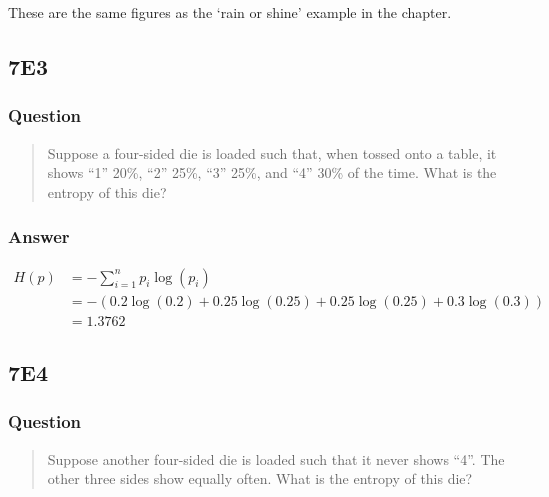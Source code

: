 \documentclass[
]{book}
\begin{document}
These are the same figures as the `rain or shine' example in the chapter.

\hypertarget{e3-5}{%
\subsection*{7E3}\label{e3-5}}

\hypertarget{question-62}{%
\subsubsection*{Question}\label{question-62}}

\begin{quote}
Suppose a four-sided die is loaded such that, when tossed onto a table, it shows ``1'' 20\%, ``2'' 25\%, ``3'' 25\%, and ``4'' 30\% of the time. What is the entropy of this die?
\end{quote}

\hypertarget{answer-62}{%
\subsubsection*{Answer}\label{answer-62}}

\[\begin{aligned}
H(p) &= -\sum^n_{i=1}p_i \log(p_i) \\
&= -(0.2 \log(0.2) + 0.25 \log(0.25) + 0.25 \log(0.25) + 0.3 \log(0.3))\\
&= 1.3762
\end{aligned}\]

\hypertarget{e4-5}{%
\subsection*{7E4}\label{e4-5}}

\hypertarget{question-63}{%
\subsubsection*{Question}\label{question-63}}

\begin{quote}
Suppose another four-sided die is loaded such that it never shows ``4''. The other three sides show equally often. What is the entropy of this die?
\end{quote}
\end{document}
